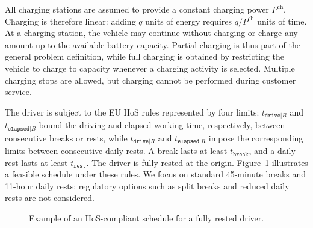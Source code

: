 \documentclass[3p,11pt,authoryear]{elsarticle}  %
\begin{document}
All charging stations are assumed to provide a constant charging power $P^{\mathrm{ch}}$. Charging is therefore linear: adding $q$ units of energy requires $q/P^{\mathrm{ch}}$ units of time. At a charging station, the vehicle may continue without charging or charge any amount up to the available battery capacity. Partial charging is thus part of the general problem definition, while full charging is obtained by restricting the vehicle to charge to capacity whenever a charging activity is selected. Multiple charging stops are allowed, but charging cannot be performed during customer service.

The driver is subject to the EU HoS rules represented by four limits: $t_{\texttt{drive}|B}$ and $t_{\texttt{elapsed}|B}$ bound the driving and elapsed working time, respectively, between consecutive breaks or rests, while $t_{\texttt{drive}|R}$ and $t_{\texttt{elapsed}|R}$ impose the corresponding limits between consecutive daily rests. A break lasts at least $t_{\texttt{break}}$, and a daily rest lasts at least $t_{\texttt{rest}}$. 
The driver is fully rested at the origin. Figure~\ref{fig:driver_schedule} illustrates a feasible schedule under these rules. We focus on standard 45-minute breaks and 11-hour daily rests; regulatory options such as split breaks and reduced daily rests are not considered.



\begin{figure}[htbp!]
\centering
{}
\caption{Example of an HoS-compliant schedule for a fully rested driver.}
\label{fig:driver_schedule}
\end{figure}
\end{document}
